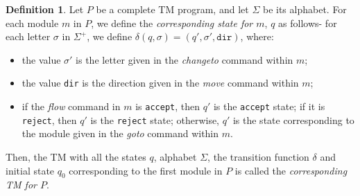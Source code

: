 \documentclass{amsart}
\theoremstyle{definition}
\newtheorem{definition}[theorem]{Definition}
\begin{document}
    \begin{definition}
        Let $P$ be a complete TM program, and let $\Sigma$ be its alphabet. For each module $m$ in $P$, we define the \emph{corresponding state for $m$}, $q$ as follows- for each letter $\sigma$ in $\Sigma^+$, we define $\delta(q, \sigma) = (q', \sigma', \texttt{dir})$, where:
        \begin{itemize}
            \item the value $\sigma'$ is the letter given in the \textit{changeto} command within $m$;
            \item the value \texttt{dir} is the direction given in the \textit{move} command within $m$;
            \item if the \textit{flow} command in $m$ is \texttt{accept}, then $q'$ is the \texttt{accept} state; if it is \texttt{reject}, then $q'$ is the \texttt{reject} state; otherwise, $q'$ is the state corresponding to the module given in the \textit{goto} command within $m$.
        \end{itemize}
        Then, the TM with all the states $q$, alphabet $\Sigma$, the transition function $\delta$ and initial state $q_0$ corresponding to the first module in $P$ is called the \emph{corresponding TM for $P$}.
    \end{definition}
\end{document}
